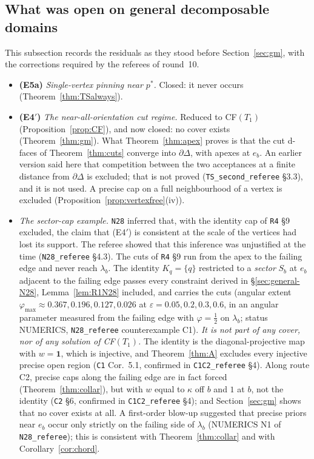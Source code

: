 \documentclass[11pt]{article}
\theoremstyle{definition}
\theoremstyle{remark}
\newcommand{\one}{\mathbf 1}
\newcommand{\src}[1]{\texttt{#1}}
\begin{document}
\subsection{What was open on general decomposable domains}\label{sec:general-open}
This subsection records the residuals as they stood before Section~\ref{sec:gm}, with the corrections required by the referees of round~10.
\begin{itemize}[leftmargin=*]
\item \textbf{(E5a)} \emph{Single-vertex pinning near $p^*$.} Closed: it never occurs (Theorem~\ref{thm:TSalways}).
\item \textbf{(E4$'$)} \emph{The near-all-orientation cut regime.} Reduced to CF$(T_1)$ (Proposition~\ref{prop:CF}), and now closed: no cover exists (Theorem~\ref{thm:gm}). What Theorem~\ref{thm:apex} proves is that the cut d-faces of Theorem~\ref{thm:cuts} converge into $\partial\Delta$, with apexes at $e_b$. An earlier version said here that competition between the two acceptances at a finite distance from $\partial\Delta$ is excluded; that is not proved (\src{TS\_second\_referee} \S3.3), and it is not used. A precise cap on a full neighbourhood of a vertex is excluded (Proposition~\ref{prop:vertexfree}(iv)).
\item \emph{The sector-cap example.} \src{N28} inferred that, with the identity cap of \src{R4} \S9 excluded, the claim that (E4$'$) is consistent at the scale of the vertices had lost its support. The referee showed that this inference was unjustified at the time (\src{N28\_referee} \S4.3). The cuts of \src{R4} \S9 run from the apex to the failing edge and never reach $\lambda_b$. The identity $K_q=\{q\}$ restricted to a \emph{sector} $S_b$ at $e_b$ adjacent to the failing edge passes every constraint derived in \S\ref{sec:general-N28}, Lemma~\ref{lem:R1N28} included, and carries the cuts (angular extent $\varphi_{\max}\approx0.367,0.196,0.127,0.026$ at $\varepsilon=0.05,0.2,0.3,0.6$, in an angular parameter measured from the failing edge with $\varphi=\tfrac12$ on $\lambda_b$; status NUMERICS, \src{N28\_referee} counterexample C1). \emph{It is not part of any cover, nor of any solution of CF$(T_1)$.} The identity is the diagonal-projective map with $w=\one$, which is injective, and Theorem~\ref{thm:A} excludes every injective precise open region (\src{C1} Cor.~5.1, confirmed in \src{C1C2\_referee} \S4). Along route C2, precise caps along the failing edge are in fact forced (Theorem~\ref{thm:collar}), but with $w$ equal to $\kappa$ off $b$ and $1$ at $b$, not the identity (\src{C2} \S6, confirmed in \src{C1C2\_referee} \S4); and Section~\ref{sec:gm} shows that no cover exists at all. A first-order blow-up suggested that precise priors near $e_b$ occur only strictly on the failing side of $\lambda_b$ (NUMERICS N1 of \src{N28\_referee}); this is consistent with Theorem~\ref{thm:collar} and with Corollary~\ref{cor:chord}.

\end{itemize}
\end{document}

